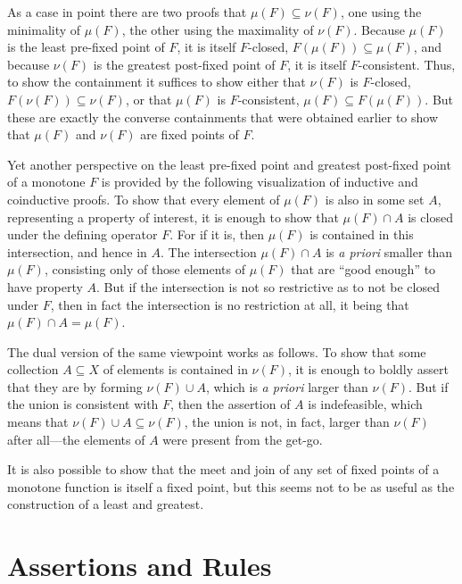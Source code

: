 \documentclass[11pt,twoside]{article}
\begin{document}
As a case in point there are two proofs that $\mu(F)\subseteq\nu(F)$, one using the minimality of
$\mu(F)$, the other using the maximality of $\nu(F)$.  Because $\mu(F)$ is the least pre-fixed
point of $F$, it is itself $F$-closed, $F(\mu(F))\subseteq\mu(F)$, and because $\nu(F)$ is the greatest
post-fixed point of $F$, it is itself $F$-consistent.  Thus, to show the containment it
suffices to show either that $\nu(F)$ is $F$-closed, $F(\nu(F))\subseteq\nu(F)$, or that
$\mu(F)$ is $F$-consistent, $\mu(F)\subseteq F(\mu(F))$.  But these are exactly the converse
containments that were obtained earlier to show that $\mu(F)$ and $\nu(F)$ are fixed points of
$F$.

\smallskip

Yet another perspective on the least pre-fixed point and greatest post-fixed point of a
monotone $F$ is provided by the following visualization of inductive and coinductive
proofs.  To show that every element of $\mu(F)$ is also in some set $A$, representing a
property of interest, it is enough to show that $\mu(F)\cap A$ is closed under the defining
operator $F$.  For if it is, then $\mu(F)$ is contained in this intersection, and hence in
$A$.  The intersection $\mu(F)\cap A$ is \emph{a priori} smaller than $\mu(F)$, consisting only
of those elements of $\mu(F)$ that are ``good enough'' to have property $A$.  But if the
intersection is not so restrictive as to not be closed under $F$, then in fact the
intersection is no restriction at all, it being that $\mu(F)\cap A=\mu(F)$.

The dual version of the same viewpoint works as follows.  To show that some collection
$A\subseteq X$ of elements is contained in $\nu(F)$, it is enough to boldly assert that they are by
forming $\nu(F)\cup A$, which is \emph{a priori} larger than $\nu(F)$.  But if the union is
consistent with $F$, then the assertion of $A$ is indefeasible, which means that
$\nu(F)\cup A\subseteq\nu(F)$, the union is not, in fact, larger than $\nu(F)$ after all---the elements of
$A$ were present from the get-go.

\smallskip

It is also possible to show that the meet and join of any set of fixed points of a
monotone function is itself a fixed point, but this seems not to be as useful as the
construction of a least and greatest.

\section{Assertions and Rules}
\end{document}
